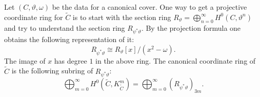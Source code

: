 \documentclass[12pt]{extarticle}
\theoremstyle{definition}
\numberwithin{theorem}{section}
\renewcommand{\tilde}{\widetilde}		%
\begin{document}
Let $(C,\vartheta,\omega)$ be the data for a canonical cover. One way to get a projective coordinate ring for $\tilde{C}$ is to start with the section ring $R_{\vartheta} = \bigoplus_{n=0}^\infty H^0(C,\vartheta^n)$ and try to understand the section ring $R_{\psi^*\vartheta}$. By the projection formula one obtains the following representation of it:
\begin{equation}\label{eq:can_coord_ring}
R_{\psi^*\vartheta} \cong R_{\vartheta}[x]/(x^2 - \omega).
\end{equation}  
The image of $x$ has degree $1$ in the above ring. The canonical coordinate ring of $\tilde{C}$ is the following subring of $R_{\psi^*\vartheta}$:
\begin{equation*}
\bigoplus_{m=0}^\infty H^0(\tilde{C},K_{\tilde{C}}^m) = \bigoplus_{m=0}^\infty \left( R_{\psi^*\vartheta} \right)_{3m}.
\end{equation*}
\end{document}

